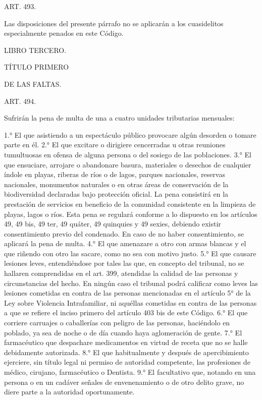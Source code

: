     ART. 493.

    Las disposiciones del presente párrafo no se aplicarán a los cuasidelitos especialmente penados en este Código.



    LIBRO TERCERO.


    TÍTULO PRIMERO

    DE LAS FALTAS.


    ART. 494.

    Sufrirán la pena de multa de una a cuatro unidades tributarias mensuales:

    1.° El que asistiendo a un espectáculo público provocare algún desorden o tomare parte en él.
    2.° El que excitare o dirigiere cencerradas u otras reuniones tumultuosas en ofensa de alguna persona o del sosiego de las poblaciones.
    3.° El que ensuciare, arrojare o abandonare basura, materiales o desechos de cualquier índole en playas, riberas de ríos o de lagos, parques nacionales, reservas nacionales, monumentos naturales o en otras áreas de conservación de la biodiversidad declaradas bajo protección oficial.
    La pena consistirá en la prestación de servicios en beneficio de la comunidad consistente en la limpieza de playas, lagos o ríos. Esta pena se regulará conforme a lo dispuesto en los artículos 49, 49 bis, 49 ter, 49 quáter, 49 quinquies y 49 sexies, debiendo existir consentimiento previo del condenado. En caso de no haber consentimiento, se aplicará la pena de multa.
    4.° El que amenazare a otro con armas blancas y el que riñendo con otro las sacare, como no sea con motivo justo.
    5.° El que causare lesiones leves, entendiéndose por tales las que, en concepto del tribunal, no se hallaren comprendidas en el art. 399, atendidas la calidad de las personas y circunstancias del hecho. En ningún caso el tribunal podrá calificar como leves las lesiones cometidas en contra de las personas mencionadas en el artículo 5° de la Ley sobre Violencia Intrafamiliar, ni aquéllas cometidas en contra de las personas a que se refiere el inciso primero del artículo 403 bis de este Código.
    6.° El que corriere carruajes o caballerías con peligro de las personas, haciéndolo en poblado, ya sea de noche o de día cuando haya aglomeración de gente.
    7.° El farmacéutico que despachare medicamentos en virtud de receta que no se halle debidamente autorizada.
    8.° El que habitualmente y después de apercibimiento ejerciere, sin título legal ni permiso de autoridad competente, las profesiones de médico, cirujano, farmacéutico o Dentista.
    9.° El facultativo que, notando en una persona o en un cadáver señales de envenenamiento o de otro delito grave, no diere parte a la autoridad oportunamente.
